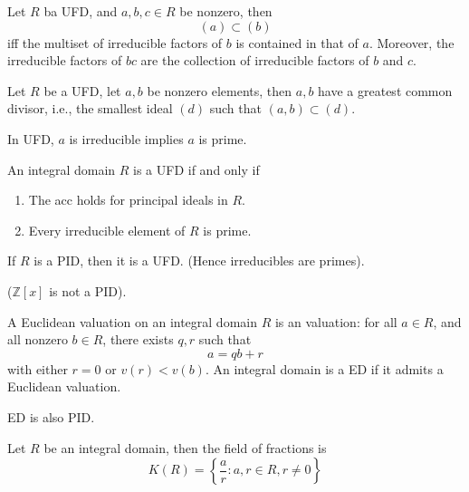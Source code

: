 \documentclass[openany]{book}
\newcommand{\Z}{\mathbb{Z}}
\begin{document}
\begin{prop}
    Let $R$ ba UFD, and $a,b,c\in R$ be nonzero, then 
    \begin{equation*}
        (a)\subset(b)
    \end{equation*}
    iff the multiset of irreducible factors of $b$ is contained in that of $a$. Moreover, the irreducible factors of $bc$ are the collection of irreducible factors of $b$ and $c$.
\end{prop}



\begin{prop}
    Let $R$ be a UFD, let $a,b$ be nonzero elements, then $a,b$ have a greatest common divisor, i.e., the smallest ideal $(d)$ such that $(a,b)\subset (d)$.
\end{prop}

\begin{prop}[*]
    In UFD, $a$ is irreducible implies $a$ is prime.
\end{prop}

\begin{thm}[*]
    An integral domain $R$ is a UFD if and only if 
    \begin{enumerate}
        \item The acc holds for principal ideals in $R$.
        \item Every irreducible element of $R$ is prime.
    \end{enumerate}
\end{thm}


\begin{prop}
    If $R$ is a PID, then it is a UFD. (Hence irreducibles are primes).

    ($\Z[x]$ is not a PID).
\end{prop}

\begin{defn}
    A Euclidean valuation on an integral domain $R$ is an valuation: for all $a\in R$, and all nonzero $b\in R$, there exists $q,r$ such that 
    \begin{equation*}
        a=qb+r
    \end{equation*}
    with either $r=0$ or $v(r)<v(b)$. An integral domain is a ED if it admits a Euclidean valuation.
\end{defn}

\begin{prop}
    ED is also PID.
\end{prop}


\begin{defn}
    Let $R$ be an integral domain, then the field of fractions is 
    \begin{equation*}
        K(R)=\left\{\frac{a}{r}: a,r\in R, r\neq 0\right\}
    \end{equation*}
\end{defn}
\end{document}
